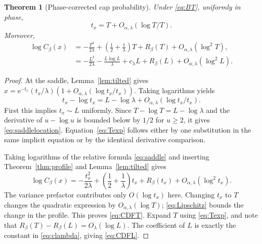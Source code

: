 \documentclass[11pt,a4paper]{article}
\newtheorem{theorem}{Theorem}[section]
\theoremstyle{definition}
\theoremstyle{remark}\newtheorem{remark}[theorem]{Remark}
\newcommand{\e}{\mathrm e}
\newcommand{\at}{\alpha,\lambda}
\begin{document}
\begin{theorem}[Phase-corrected cap probability]
\label{thm:CDF}
Under \eqref{eq:BT}, uniformly in phase,
\begin{equation}
 t_x=T+O_{\at}(\log T/T).
 \label{eq:saddlelocation}
\end{equation}
Moreover,
\begin{align}
 \log C_\beta(x)
 &=-\frac{T^2}{2\lambda}
   +\left(\frac12+\frac1\lambda\right)T+R_\beta(T)
      +O_{\at}(\log^2 T),\label{eq:CDFT}\\
 &=-\frac{L^2}{2\lambda}-\frac{L\log L}{\lambda}
      +c_\lambda L+R_\beta(L)+O_{\at}(\log^2 L).
 \label{eq:CDFL}
\end{align}
\end{theorem}
\begin{proof}
At the saddle, Lemma~\ref{lem:tilted} gives
$x=\e^{-t_x}(t_x/\lambda)(1+O_{\at}(\log t_x/t_x))$.
Taking logarithms yields
\[
 t_x-\log t_x=L-\log\lambda+O_{\at}(\log t_x/t_x).
\]
First this implies $t_x\sim L$ uniformly.  Since
$T-\log T=L-\log\lambda$ and the derivative of $u-\log u$ is bounded below
by $1/2$ for $u\ge2$, it gives \eqref{eq:saddlelocation}.
Equation~\eqref{eq:Texp} follows either by one substitution in the same
implicit equation or by the identical derivative comparison.

Taking logarithms of the relative formula \eqref{eq:saddle} and inserting
Theorem~\ref{thm:profile} and Lemma~\ref{lem:tilted} gives
\[
 \log C_\beta(x)
 =-\frac{t_x^2}{2\lambda}
   +\left(\frac12+\frac1\lambda\right)t_x+R_\beta(t_x)
     +O_{\at}(\log^2 t_x).
\]
The variance prefactor contributes only $O(\log t_x)$ here.
Changing $t_x$ to $T$ changes the quadratic expression by $O_{\at}(\log T)$;
\eqref{eq:Lipschitz} bounds the change in the profile.  This proves
\eqref{eq:CDFT}.  Expand $T$ using \eqref{eq:Texp}, and note that
$R_\beta(T)-R_\beta(L)=O_\lambda(\log L)$.
The coefficient of $L$ is exactly the constant in \eqref{eq:clambda}, giving
\eqref{eq:CDFL}.
\end{proof}
\end{document}
